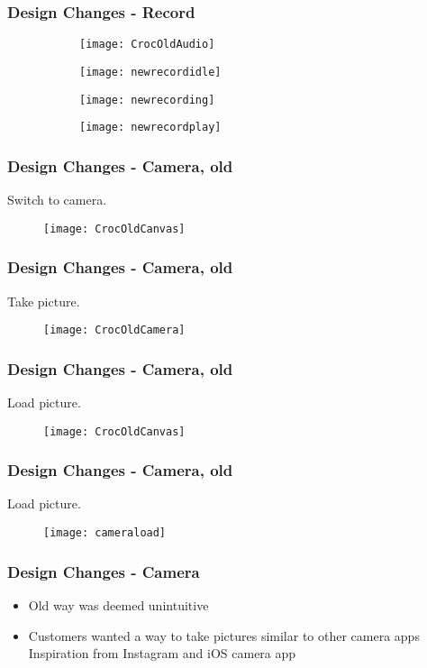\begin{frame}
	\frametitle{Design Changes - Record}
	\begin{figure}
	        \centering
	        \begin{subfigure}[b]{0.24\textwidth}
	                \texttt{[image: CrocOldAudio]}
	        \end{subfigure}%
	        \begin{subfigure}[b]{0.24\textwidth}
	                \texttt{[image: newrecordidle]}
	        \end{subfigure}
	        \begin{subfigure}[b]{0.24\textwidth}
	                \texttt{[image: newrecording]}
	        \end{subfigure}
 	        \begin{subfigure}[b]{0.24\textwidth}
 	                \texttt{[image: newrecordplay]}
 	        \end{subfigure}
	\end{figure}
\end{frame}

\begin{frame}
	\frametitle{Design Changes - Camera, old}
	Switch to camera.
		\begin{figure}
		\centering
			\texttt{[image: CrocOldCanvas]}
		\end{figure}
\end{frame}

\begin{frame}
	\frametitle{Design Changes - Camera, old}
	Take picture.
		\begin{figure}
		\centering
			\texttt{[image: CrocOldCamera]}
		\end{figure}
\end{frame}

\begin{frame}
	\frametitle{Design Changes - Camera, old}
	Load picture.
		\begin{figure}
		\centering
			\texttt{[image: CrocOldCanvas]}
		\end{figure}
\end{frame}

\begin{frame}
	\frametitle{Design Changes - Camera, old}
	Load picture.
		\begin{figure}
		\centering
			\texttt{[image: cameraload]}
		\end{figure}
\end{frame}
\begin{frame}
	\frametitle{Design Changes - Camera}
	\begin{itemize}
		\item Old way was deemed unintuitive
		\item Customers wanted a way to take pictures similar to other camera apps
		\itme Inspiration from Instagram and iOS camera app
	\end{itemize}
\end{frame}

